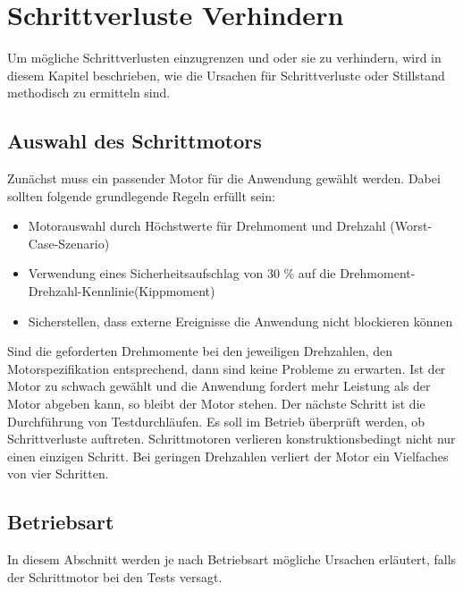 %

\chapter{Schrittverluste Verhindern}
Um mögliche Schrittverlusten einzugrenzen und oder sie zu verhindern, wird in diesem Kapitel beschrieben, wie die Ursachen für Schrittverluste oder Stillstand methodisch zu ermitteln sind. \cite{FaulhaberDriveSystems.2020}

\section{Auswahl des Schrittmotors}
Zunächst muss ein passender Motor für die Anwendung gewählt werden. Dabei sollten folgende grundlegende Regeln erfüllt sein:
\begin{itemize}
	\item Motorauswahl durch Höchstwerte für Drehmoment und Drehzahl (Worst-Case-Szenario)
	\item Verwendung eines Sicherheitsaufschlag von 30 \% auf die Drehmoment-Drehzahl-Kennlinie(Kippmoment)
	\item Sicherstellen, dass externe Ereignisse die Anwendung nicht blockieren können
\end{itemize}

Sind die geforderten Drehmomente bei den jeweiligen Drehzahlen, den Motorspezifikation entsprechend, dann sind keine Probleme zu erwarten. Ist der Motor zu schwach gewählt und die Anwendung fordert mehr Leistung als der Motor abgeben kann, so bleibt der Motor stehen. Der nächste Schritt ist die Durchführung von Testdurchläufen. Es soll im Betrieb überprüft werden, ob Schrittverluste auftreten. Schrittmotoren verlieren konstruktionsbedingt nicht nur einen einzigen Schritt. Bei geringen Drehzahlen verliert der Motor ein Vielfaches von vier Schritten.\cite{FaulhaberDriveSystems.2020}

\section{Betriebsart}

In diesem Abschnitt werden je nach Betriebsart mögliche Ursachen erläutert, falls der Schrittmotor bei den Tests versagt.

